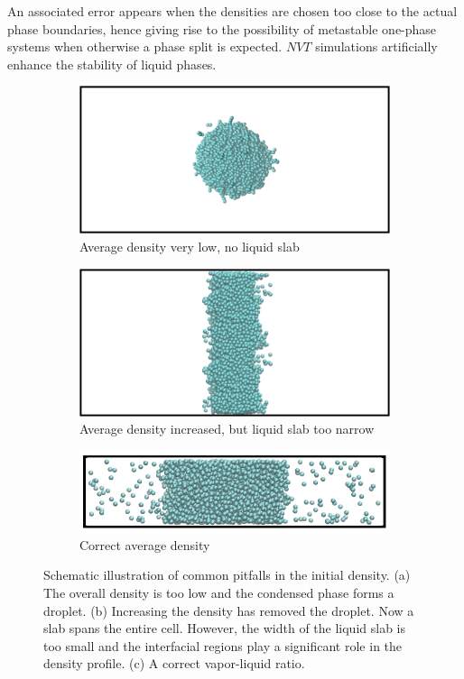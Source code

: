 \documentclass[9pt,tutorial]{livecoms}
\begin{document}
An associated error appears when the densities are chosen too close to the
actual phase boundaries, hence giving rise to the possibility of metastable
one-phase systems when otherwise a phase split is expected. $NVT$
simulations artificially enhance the stability of liquid phases.

\begin{figure}
	\centering
	\begin{subfigure}{0.3\textwidth} %
    \includegraphics[width=1\textwidth]{gfx/Fig_23_a.png}
    \caption{Average density very low, no liquid slab}
	\end{subfigure}
	\begin{subfigure}{0.3\textwidth} %
    \includegraphics[width=1\textwidth]{gfx/Fig_23_b.png}
    \caption{Average density increased, but liquid slab too narrow}
	\end{subfigure}
	\begin{subfigure}{0.3\textwidth} %
    \includegraphics[width=1\textwidth]{gfx/Fig_23c.jpeg}
    \caption{Correct average density}
	\end{subfigure}
  \caption{Schematic illustration of common pitfalls in the initial density. (a) The overall density is too low
           and the condensed phase forms a droplet. (b) Increasing the density has removed the droplet.
           Now a slab spans the entire cell. However, the width of the liquid slab is too small and the
           interfacial regions play a significant role in the density profile. (c) A correct vapor-liquid ratio.}
\label{fig:23}
\end{figure}
\end{document}
